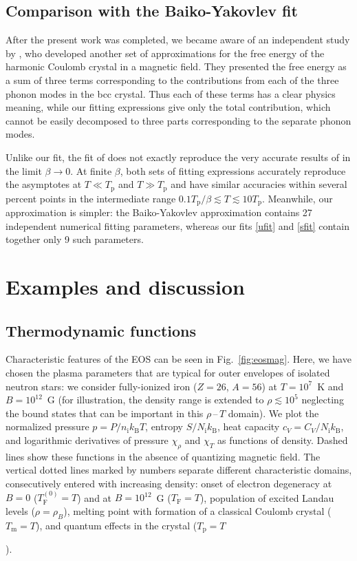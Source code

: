 \documentclass[traditabstract]{aa}
\newcommand{\nion}{n_\mathrm{i}}
\newcommand{\Nion}{N_\mathrm{i}}
\newcommand{\kB}{k_\mathrm{B}}
\newcommand{\TF}{T_\mathrm{F}}
\newcommand{\Tm}{T_\mathrm{m}}
\newcommand{\Tp}{T_\mathrm{p}}
\begin{document}
{%
\subsection{Comparison with the Baiko-Yakovlev fit}

After the present work was completed, we became aware
of an independent study by \citet{BYak}, who developed
another set of approximations for the free energy of the
harmonic Coulomb crystal in a magnetic field. They presented
the free energy as a sum of three terms corresponding to the
contributions from each of the three phonon modes in the bcc
crystal. Thus each of these terms has a clear physics
meaning, while our fitting expressions give only the total
contribution, which cannot be easily decomposed to three
parts corresponding to the separate phonon modes.

Unlike our fit, the fit of \citet{BYak} does not exactly
reproduce the very accurate results of \cite{Baiko-ea01} in
the limit $\beta\to0$. At finite $\beta$, both sets of
fitting expressions accurately reproduce the asymptotes at
$T\ll\Tp$ and $T\gg\Tp$ and have similar accuracies within
several percent points in the intermediate range
$0.1\Tp/\beta\lesssim T\lesssim10\Tp$.
Meanwhile, our approximation is simpler:
the Baiko-Yakovlev approximation contains 27
independent numerical fitting parameters, whereas our fits
\ref{ufit} and \ref{sfit} contain together only 9 such
parameters.

\section{Examples and discussion}
\label{sect:examples}

\subsection{Thermodynamic functions}

Characteristic features of the EOS can be seen in
Fig.~\ref{fig:eosmag}. Here, we have chosen the plasma
parameters that are typical for outer envelopes of isolated
neutron stars: we consider fully-ionized iron ($Z=26$,
$A=56$) at $T=10^7$~K and $B=10^{12}$~G 
(for illustration, the density range is extended to
$\rho\lesssim10^5$ neglecting the bound states
that can be important in this $\rho$\,--\,$T$ domain). 
We plot the normalized
pressure $p=P/\nion\kB T$, entropy $S/\Nion\kB$, heat
capacity $c_V=C_V/\Nion\kB$, and 
logarithmic derivatives of pressure
$\chi_\rho$ and $\chi_T$ as functions of density. Dashed
lines show these functions in the absence of quantizing
magnetic field. The vertical dotted lines marked by numbers
separate different characteristic domains, consecutively
entered with increasing density: onset of electron
degeneracy at $B=0$ ($\TF^\mathrm{(0)}=T$) and at
$B=10^{12}$~G ($\TF=T$),  population of excited Landau
levels ($\rho=\rho_B$), melting point with formation of a
classical Coulomb crystal ($\Tm=T$), and quantum effects in the
crystal ($\Tp=T$}).
\end{document}
